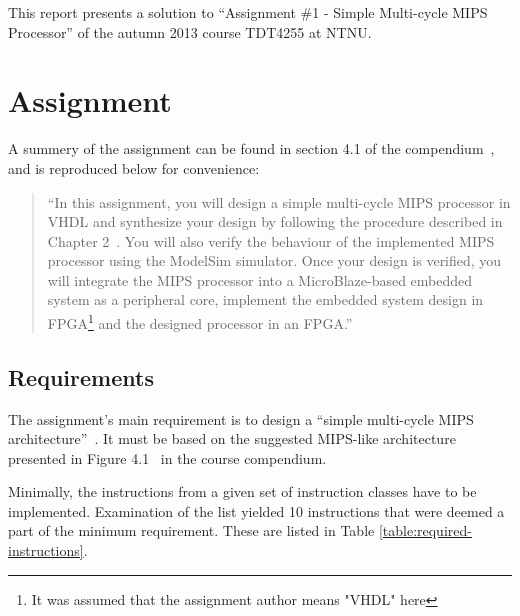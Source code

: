 This report presents a solution to ``Assignment \#1 - Simple Multi-cycle MIPS Processor'' of the autumn 2013 course TDT4255 at NTNU.

\section{Assignment}

A summery of the assignment can be found in section 4.1 of the compendium~\cite[p.114]{compendium}, and is reproduced below for convenience:

\begin{quote}
``In this assignment, you will design a simple multi-cycle MIPS processor in VHDL and synthesize your design by following the procedure described in Chapter 2~\cite[of the compendium]{compendium}.
You will also verify the behaviour of the implemented MIPS processor using the ModelSim simulator.
Once your design is verified, you will integrate the MIPS processor into a MicroBlaze-based embedded system as a peripheral core, implement the embedded system design in FPGA\footnote{It was assumed that the assignment author means "VHDL" here} and the designed processor in an FPGA.''
\end{quote}

\subsection{Requirements}

The assignment's main requirement is to design a ``simple multi-cycle MIPS architecture''~\cite[p.114]{compendium}. It must be based on the suggested MIPS-like architecture presented in Figure 4.1~\cite[p.115]{compendium} in the course compendium.

Minimally, the instructions from a given set of instruction classes have to be implemented. 
Examination of the list yielded 10 instructions that were deemed a part of the minimum requirement.
These are listed in Table \vref{table:required-instructions}.

